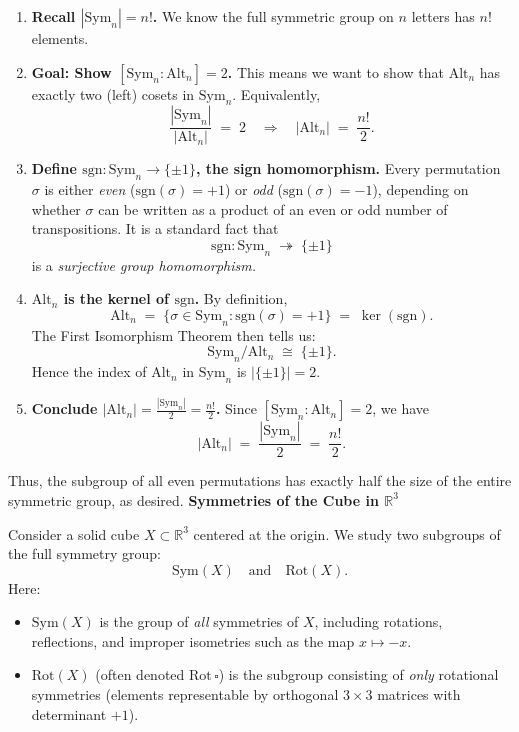 \documentclass[12pt]{article}
\theoremstyle{definition} %
\theoremstyle{plain} %
\begin{document}
\begin{enumerate}
    \item \textbf{Recall $|\mathrm{Sym}_n| = n!$.} 
    We know the full symmetric group on $n$ letters has $n!$ elements.

    \item \textbf{Goal: Show $[\mathrm{Sym}_n : \mathrm{Alt}_n] = 2$.}
    This means we want to show that $\mathrm{Alt}_n$ has exactly two (left) cosets in $\mathrm{Sym}_n$.  Equivalently,
    \[
    \frac{|\mathrm{Sym}_n|}{|\mathrm{Alt}_n|} \;=\; 2
    \quad\Longrightarrow\quad
    |\mathrm{Alt}_n| \;=\;\frac{n!}{2}.
    \]

    \item \textbf{Define $\mathrm{sgn}: \mathrm{Sym}_n \to \{\pm1\}$, the sign homomorphism.}
    Every permutation $\sigma$ is either \emph{even} ($\mathrm{sgn}(\sigma) = +1$) or \emph{odd} ($\mathrm{sgn}(\sigma)=-1$), depending on whether $\sigma$ can be written as a product of an even or odd number of transpositions.  It is a standard fact that
    \[
      \mathrm{sgn}: \mathrm{Sym}_n \;\twoheadrightarrow\; \{\pm 1\}
    \]
    is a \emph{surjective group homomorphism.}

    \item \textbf{$\mathrm{Alt}_n$ is the kernel of $\mathrm{sgn}$.}
    By definition,
    \[
      \mathrm{Alt}_n 
      \;=\; \{\sigma \in \mathrm{Sym}_n : \mathrm{sgn}(\sigma) = +1\}
      \;=\; \ker(\mathrm{sgn}).
    \]
    The First Isomorphism Theorem then tells us:
    \[
      \mathrm{Sym}_n / \mathrm{Alt}_n 
      \;\cong\; \{\pm1\}.
    \]
    Hence the index of $\mathrm{Alt}_n$ in $\mathrm{Sym}_n$ is $|\{\pm1\}| = 2$. 

    \item \textbf{Conclude $|\mathrm{Alt}_n| = \tfrac{|\mathrm{Sym}_n|}{2} = \frac{n!}{2}$.}
    Since $[\mathrm{Sym}_n : \mathrm{Alt}_n] = 2$, we have
    \[
      |\mathrm{Alt}_n|
      \;=\;
      \frac{|\mathrm{Sym}_n|}{2}
      \;=\;
      \frac{n!}{2}.
    \]

\end{enumerate}

\noindent
Thus, the subgroup of all even permutations has exactly half the size of the entire symmetric group, as desired.
\noindent
\textbf{Symmetries of the Cube in $\mathbb{R}^3$}

\bigskip

\noindent
Consider a solid cube $X \subset \mathbb{R}^3$ centered at the origin. We study two subgroups of the full symmetry group:
\[
\mathrm{Sym}(X) \quad \text{and} \quad \mathrm{Rot}(X).
\]
Here:
\begin{itemize}
    \item $\mathrm{Sym}(X)$ is the group of \emph{all} symmetries of $X$, including rotations, reflections, and improper isometries such as the map $x \mapsto -x$.
    \item $\mathrm{Rot}(X)$ (often denoted $\mathrm{Rot}\,\square$) is the subgroup consisting of \emph{only} rotational symmetries (elements representable by orthogonal $3\times 3$ matrices with determinant $+1$).
\end{itemize}
\end{document}
